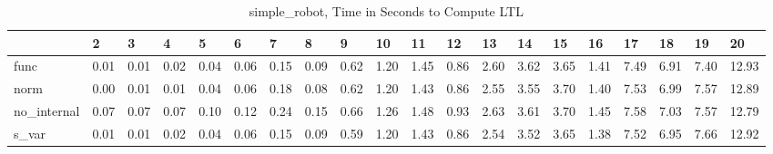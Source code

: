 \begin{table}
\centering
\caption{simple_robot, Time in Seconds to Compute LTL}
\label{simple_robot_LTL_time}
\begin{tabular}{llllllllllllllllllll}
\toprule
{} &     2 &     3 &     4 &     5 &     6 &     7 &     8 &     9 &    10 &    11 &    12 &    13 &    14 &    15 &    16 &    17 &    18 &    19 &     20 \\
\midrule
func        &  0.01 &  0.01 &  0.02 &  0.04 &  0.06 &  0.15 &  0.09 &  0.62 &  1.20 &  1.45 &  0.86 &  2.60 &  3.62 &  3.65 &  1.41 &  7.49 &  6.91 &  7.40 &  12.93 \\
norm        &  0.00 &  0.01 &  0.01 &  0.04 &  0.06 &  0.18 &  0.08 &  0.62 &  1.20 &  1.43 &  0.86 &  2.55 &  3.55 &  3.70 &  1.40 &  7.53 &  6.99 &  7.57 &  12.89 \\
no\_internal &  0.07 &  0.07 &  0.07 &  0.10 &  0.12 &  0.24 &  0.15 &  0.66 &  1.26 &  1.48 &  0.93 &  2.63 &  3.61 &  3.70 &  1.45 &  7.58 &  7.03 &  7.57 &  12.79 \\
s\_var       &  0.01 &  0.01 &  0.02 &  0.04 &  0.06 &  0.15 &  0.09 &  0.59 &  1.20 &  1.43 &  0.86 &  2.54 &  3.52 &  3.65 &  1.38 &  7.52 &  6.95 &  7.66 &  12.92 \\
\bottomrule
\end{tabular}
\end{table}
